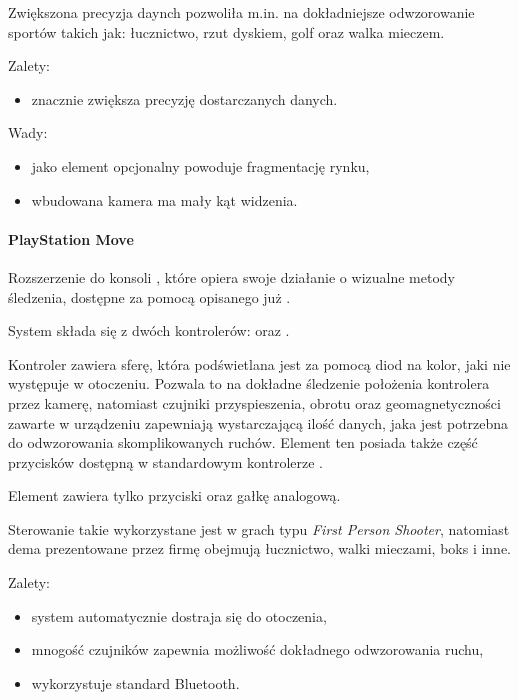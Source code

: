 Zwiększona precyzja daynch pozwoliła m.in. na dokładniejsze odwzorowanie sportów takich jak: łucznictwo, rzut dyskiem, golf oraz walka mieczem.

Zalety:
\begin{itemize}
  \item znacznie zwiększa precyzję dostarczanych danych.
\end{itemize}

Wady:
\begin{itemize}
  \item jako element opcjonalny powoduje fragmentację rynku,
  \item wbudowana kamera ma mały kąt widzenia.
\end{itemize}

\paragraph{PlayStation Move}
Rozszerzenie do konsoli , które opiera swoje działanie o wizualne metody śledzenia, dostępne za pomocą opisanego już .

System  składa się z dwóch kontrolerów:  oraz .

Kontroler  zawiera sferę, która podświetlana jest za pomocą diod na kolor, jaki nie występuje w otoczeniu. Pozwala to na dokładne śledzenie położenia kontrolera przez kamerę, natomiast czujniki przyspieszenia, obrotu oraz geomagnetyczności zawarte w urządzeniu zapewniają wystarczającą ilość danych, jaka jest potrzebna do odwzorowania skomplikowanych ruchów. Element ten posiada także część przycisków dostępną w standardowym kontrolerze .

Element  zawiera tylko przyciski oraz gałkę analogową.

Sterowanie takie wykorzystane jest w grach typu \textsl{First Person Shooter}, natomiast dema prezentowane przez firmę  obejmują łucznictwo, walki mieczami, boks i inne.

Zalety:
\begin{itemize}
  \item system automatycznie dostraja się do otoczenia,
  \item mnogość czujników zapewnia możliwość dokładnego odwzorowania ruchu,
  \item wykorzystuje standard Bluetooth.
\end{itemize}

